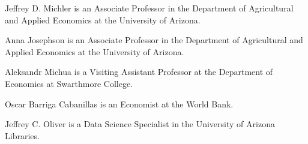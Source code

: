 


\begin{aboutauthors}
Jeffrey D. Michler is an Associate Professor in the Department of Agricultural and Applied Economics at the University of Arizona.

Anna Josephson is an Associate Professor in the Department of Agricultural and Applied Economics at the University of Arizona.

Aleksandr Michua is a Visiting Assistant Professor at the Department of Economics at Swarthmore College.

Oscar Barriga Cabanillas is an Economist at the World Bank.

Jeffrey C. Oliver is a Data Science Specialist in the University of Arizona Libraries.
\end{aboutauthors}

\endinput
